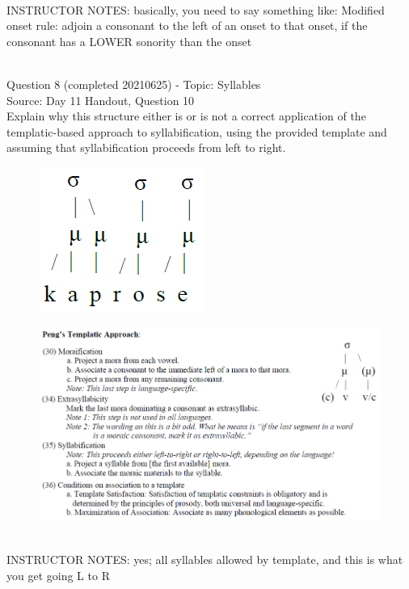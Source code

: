 \documentclass[12pt]{article}
\begin{document}
~\\
INSTRUCTOR NOTES: basically, you need to say something like: Modified onset rule: adjoin a consonant to the left of an onset to that onset, if the consonant has a LOWER sonority than the onset


~\\

{\large Question 8} (completed 20210625) - Topic: Syllables\\
Source: Day 11 Handout, Question 10\\

Explain why this structure either is or is not a correct application of the templatic-based approach to syllabification, using the provided template and assuming that syllabification proceeds from left to right.\\

\begin{figure}[H]
\includegraphics{../images/pengtemplate_kaprose_yes.png}
\end{figure}
\begin{figure}[H]
\includegraphics{../images/peng_template_withdiagram.png}
\end{figure}

~\\
INSTRUCTOR NOTES: yes; all syllables allowed by template, and this is what you get going L to R
\end{document}
